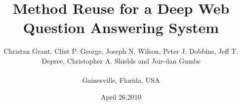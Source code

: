 \documentclass{www2010-submission}
\begin{document}
\title{Method Reuse for a Deep Web Question Answering System} 
\author{
	 \alignauthor Christan Grant, Clint P. George, Joseph N. Wilson, Peter J. Dobbins, Jeff T. Depree, Christopher A. Shields and Joir-dan Gumbs\\
	  \\ \affaddr
{ Gainesville, Florida, USA} \\
}
\date{April 26,2010}

\maketitle
















\end{document}
